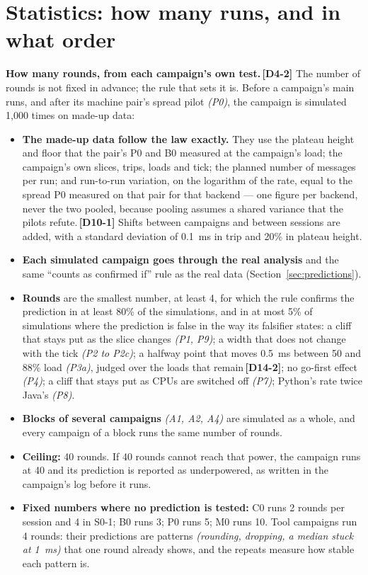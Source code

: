 \documentclass[11pt]{article}
\newcommand{\gl}[1]{{\color{soft}\itshape\small (#1)}}
\newcommand{\chgold}[1]{\,{\color{oldcol}\bfseries\footnotesize[#1]}}
\begin{document}
\section{Statistics: how many runs, and in what order}\label{sec:stats}

\textbf{How many rounds, from each campaign's own test.}\chgold{D4-2} The number of rounds is not fixed in advance; the rule that sets it is. Before a campaign's main runs, and after its machine pair's spread pilot \gl{P0}, the campaign is simulated 1,000 times on made-up data:
\begin{itemize}
  \item \textbf{The made-up data follow the law exactly.} They use the plateau height and floor that the pair's P0 and B0 measured at the campaign's load; the campaign's own slices, trips, loads and tick; the planned number of messages per run; and run-to-run variation, on the logarithm of the rate, equal to the spread P0 measured on that pair for that backend --- one figure per backend, never the two pooled, because pooling assumes a shared variance that the pilots refute.\chgold{D10-1} Shifts between campaigns and between sessions are added, with a standard deviation of 0.1~ms in trip and 20\% in plateau height.
  \item \textbf{Each simulated campaign goes through the real analysis} and the same ``counts as confirmed if'' rule as the real data (Section~\ref{sec:predictions}).
  \item \textbf{Rounds} are the smallest number, at least 4, for which the rule confirms the prediction in at least 80\% of the simulations, and in at most 5\% of simulations where the prediction is false in the way its falsifier states: a cliff that stays put as the slice changes \gl{P1, P9}; a width that does not change with the tick \gl{P2 to P2c}; a halfway point that moves 0.5~ms between 50 and 88\% load \gl{P3a}, judged over the loads that remain\chgold{D14-2}; no go-first effect \gl{P4}; a cliff that stays put as CPUs are switched off \gl{P7}; Python's rate twice Java's \gl{P8}.
  \item \textbf{Blocks of several campaigns} \gl{A1, A2, A4} are simulated as a whole, and every campaign of a block runs the same number of rounds.
  \item \textbf{Ceiling:} 40 rounds. If 40 rounds cannot reach that power, the campaign runs at 40 and its prediction is reported as underpowered, as written in the campaign's log before it runs.
  \item \textbf{Fixed numbers where no prediction is tested:} C0 runs 2 rounds per session and 4 in S0-1; B0 runs 3; P0 runs 5; M0 runs 10. Tool campaigns run 4 rounds: their predictions are patterns \gl{rounding, dropping, a median stuck at 1~ms} that one round already shows, and the repeats measure how stable each pattern is.

\end{itemize}
\end{document}
